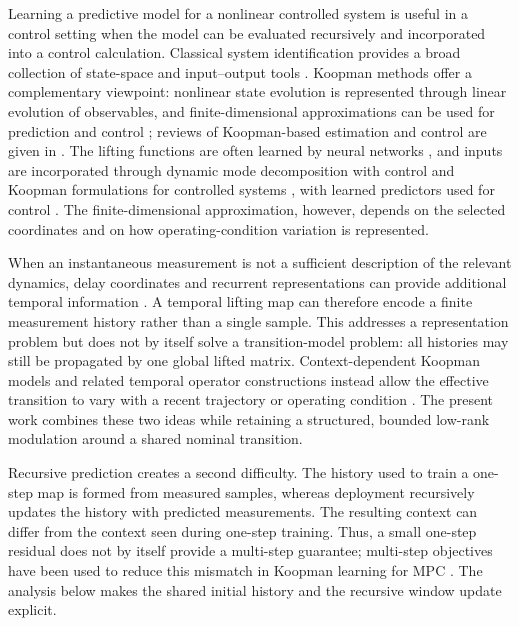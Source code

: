 \documentclass[journal]{IEEEtran}
\begin{document}
Learning a predictive model for a nonlinear controlled system is useful in a control setting when the model can be evaluated recursively and incorporated into a control calculation. Classical system identification provides a broad collection of state-space and input--output tools \cite{ljung1999system,vanoverschee1994n4sid,nelles2020nonlinear}. Koopman methods offer a complementary viewpoint: nonlinear state evolution is represented through linear evolution of observables, and finite-dimensional approximations can be used for prediction and control \cite{koopman1931hamiltonian,mezic2005spectral,williams2015data,korda2018linear,brunton2022modern}; reviews of Koopman-based estimation and control are given in \cite{otto2021koopman,duran2025control,strasser2026overview}. The lifting functions are often learned by neural networks \cite{lusch2018deep,takeishi2017koopman,otto2019linearly}, and inputs are incorporated through dynamic mode decomposition with control and Koopman formulations for controlled systems \cite{proctor2016dmdc,proctor2018generalizing}, with learned predictors used for control \cite{han2020deep,feizi2025deepkoopman,wu2026multistep}. The finite-dimensional approximation, however, depends on the selected coordinates and on how operating-condition variation is represented.

When an instantaneous measurement is not a sufficient description of the relevant dynamics, delay coordinates and recurrent representations can provide additional temporal information \cite{brunton2017chaos,kamb2020timedelay,arbabi2017ergodic,das2019delay,forgione2021dynonet,shenoy2025temporal,han2024robust}. A temporal lifting map can therefore encode a finite measurement history rather than a single sample. This addresses a representation problem but does not by itself solve a transition-model problem: all histories may still be propagated by one global lifted matrix. Context-dependent Koopman models and related temporal operator constructions instead allow the effective transition to vary with a recent trajectory or operating condition \cite{liu2023koopa,li2025mamko,forootani2025deepkoopformer,forootani2026spectral}. The present work combines these two ideas while retaining a structured, bounded low-rank modulation around a shared nominal transition.

Recursive prediction creates a second difficulty. The history used to train a one-step map is formed from measured samples, whereas deployment recursively updates the history with predicted measurements. The resulting context can differ from the context seen during one-step training. Thus, a small one-step residual does not by itself provide a multi-step guarantee; multi-step objectives have been used to reduce this mismatch in Koopman learning for MPC \cite{wu2026multistep}. The analysis below makes the shared initial history and the recursive window update explicit.
\end{document}
